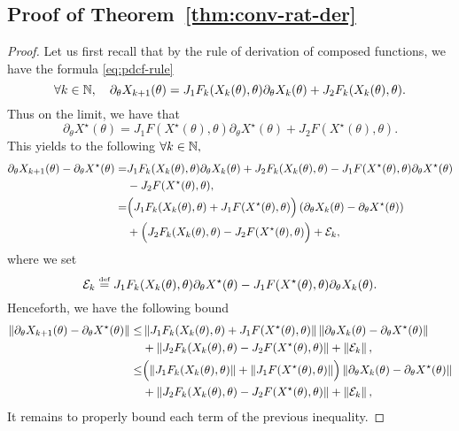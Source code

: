 \begin{appendices}
\subsection{Proof  of Theorem~\ref{thm:conv-rat-der}}\label{prf:thm:conv-rat-der}

\begin{proof}
Let us first recall that by the rule of derivation of composed functions, we have the formula \eqref{eq:pdcf-rule} 
\[
 \forall k\in\mathbb{N}, \quad \partial_{\theta}X_{k+1}(\theta)=J_1F_k(X_k(\theta),\theta)\partial_{\theta}X_k(\theta)+J_2F_k(X_k(\theta),\theta).
\]
Thus on the limit, we have that 
\[
\partial_{\theta}X^{\star}(\theta)=J_1F(X^{\star}(\theta),\theta)\partial_{\theta}X^{\star}(\theta)+J_2F(X^{\star}(\theta),\theta).
\]
This yields to the following $\forall k\in\mathbb{N},$
\begin{align*}
\partial_{\theta}X_{k+1}(\theta)-\partial_{\theta}X^{\star}(\theta)=&J_1F_k(X_k(\theta),\theta)\partial_{\theta}X_k(\theta)+J_2F_k(X_k(\theta),\theta)-J_1F(X^{\star}(\theta),\theta)\partial_{\theta}X^{\star}(\theta)\\
&-J_2F(X^{\star}(\theta),\theta),\\
=&\Big({J_1F_k(X_k(\theta),\theta)+J_1F(X^{\star}(\theta),\theta)}\Big)\left({\partial_{\theta}X_k(\theta)-\partial_{\theta}X^{\star}(\theta)}\right)\\
&+\Big({J_2F_k(X_k(\theta),\theta)-J_2F(X^{\star}(\theta),\theta)}\Big)+\mathcal{E}_k,
\end{align*}
where we set 
\[
\mathcal{E}_k\stackrel{\text{\rm\tiny def}}{=} J_1F_k(X_k(\theta),\theta)\partial_{\theta}X^{\star}(\theta)-J_1F(X^{\star}(\theta),\theta)\partial_{\theta}X_k(\theta).
\]
Henceforth, we have the following bound 
\begin{align*}
\left\Vert {\partial_{\theta}X_{k+1}(\theta)-\partial_{\theta}X^{\star}(\theta)} \right\Vert\leq&\left\Vert {J_1F_k(X_k(\theta),\theta)+J_1F(X^{\star}(\theta),\theta)} \right\Vert\left\Vert {\partial_{\theta}X_k(\theta)-\partial_{\theta}X^{\star}(\theta)} \right\Vert\\
&+\left\Vert {J_2F_k(X_k(\theta),\theta)-J_2F(X^{\star}(\theta),\theta)} \right\Vert+\left\Vert {\mathcal{E}_k} \right\Vert,\\
\leq&\Big({\left\Vert {J_1F_k(X_k(\theta),\theta)} \right\Vert+\left\Vert {J_1F(X^{\star}(\theta),\theta)} \right\Vert}\Big)\left\Vert {\partial_{\theta}X_k(\theta)-\partial_{\theta}X^{\star}(\theta)} \right\Vert\\
&+\left\Vert {J_2F_k(X_k(\theta),\theta)-J_2F(X^{\star}(\theta),\theta)} \right\Vert+\left\Vert {\mathcal{E}_k} \right\Vert,
\end{align*}
It remains to properly bound each term of the previous inequality. 


\end{proof}
\end{appendices}
